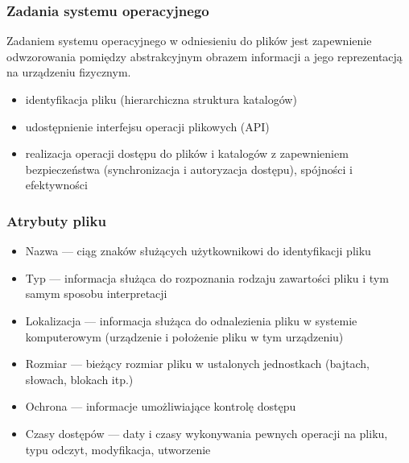 \documentclass[12pt]{article}
\begin{document}
    \subsubsection{Zadania systemu operacyjnego}
    Zadaniem systemu operacyjnego w odniesieniu do plików jest zapewnienie odwzorowania pomiędzy abstrakcyjnym obrazem
    informacji a jego reprezentacją na urządzeniu fizycznym.
    \begin{itemize}
        \item identyfikacja pliku (hierarchiczna struktura katalogów)
        \item udostępnienie interfejsu operacji plikowych (API)
        \item realizacja operacji dostępu do plików i katalogów z zapewnieniem bezpieczeństwa (synchronizacja i autoryzacja dostępu),
    spójności i efektywności
    \end{itemize}
    
    \subsubsection{Atrybuty pliku}
    \begin{itemize}
        \item Nazwa — ciąg znaków służących użytkownikowi do identyfikacji pliku
        \item Typ — informacja służąca do rozpoznania rodzaju zawartości pliku i tym samym sposobu interpretacji
        \item Lokalizacja — informacja służąca do odnalezienia pliku w systemie komputerowym (urządzenie i położenie pliku w tym
        urządzeniu)
        \item Rozmiar — bieżący rozmiar pliku w ustalonych jednostkach (bajtach, słowach, blokach itp.)
        \item Ochrona — informacje umożliwiające kontrolę dostępu
        \item Czasy dostępów — daty i czasy wykonywania pewnych operacji na pliku, typu odczyt, modyfikacja, utworzenie
    \end{itemize}
    
\end{document}
